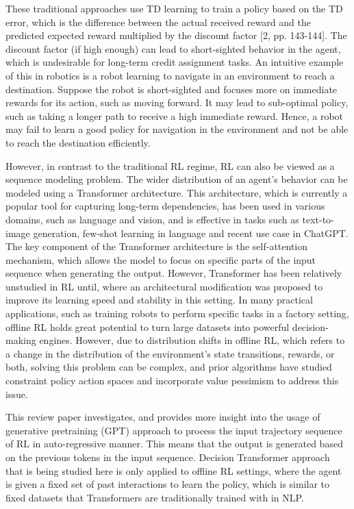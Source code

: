 \documentclass[conference]{IEEEtran}
\begin{document}
These traditional approaches use TD learning to train a policy based on the TD error, which is the difference between the actual received reward and the predicted expected reward multiplied by the discount factor [2, pp. 143-144]. The discount factor (if high enough) can lead to short-sighted behavior in the agent, which is undesirable for long-term credit assignment tasks. An intuitive example of this in robotics is a robot learning to navigate in an environment to reach a destination. Suppose the robot is short-sighted and focuses more on immediate rewards for its action, such as moving forward. It may lead to sub-optimal policy, such as taking a longer path to receive a high immediate reward. Hence, a robot may fail to learn a good policy for navigation in the environment and not be able to reach the destination efficiently. 

However, in contrast to the traditional RL regime, RL can also be viewed as a sequence modeling problem. The wider distribution of an agent's behavior can be modeled using a Transformer architecture\cite{b3}. This architecture, which is currently a popular tool for capturing long-term dependencies, has been used in various domains, such as language and vision, and is effective in tasks such as text-to-image generation\cite{b4}, few-shot learning in language\cite{b5} and recent use case in ChatGPT. The key component of the Transformer architecture is the self-attention mechanism, which allows the model to focus on specific parts of the input sequence when generating the output. However, Transformer has been relatively unstudied in RL until\cite{b6}, where an architectural modification was proposed to improve its learning speed and stability in this setting. In many practical applications, such as training robots to perform specific tasks in a factory setting, offline RL\cite{b7}  holds great potential to turn large datasets into powerful decision-making engines. However, due to distribution shifts in offline RL, which refers to a change in the distribution of the environment's state transitions, rewards, or both, solving this problem can be complex, and prior algorithms have studied constraint policy action spaces\cite{b8} and incorporate value pessimism\cite{b9} to address this issue.

This review paper investigates\cite{b1}, and provides more insight into the usage of generative pretraining (GPT)\cite{b10} approach to process the input trajectory sequence of RL in auto-regressive manner. This means that the output is generated based on the previous tokens in the input sequence. Decision Transformer\cite{b1} approach that is being studied here is only applied to offline RL settings, where the agent is given a fixed set of past interactions to learn the policy, which is similar to fixed datasets that Transformers are traditionally trained with in NLP. 
\end{document}
